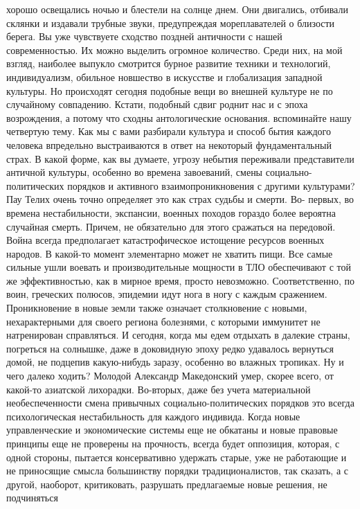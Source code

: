 хорошо освещались ночью и блестели на солнце днем. Они двигались, отбивали
склянки и издавали трубные звуки, предупреждая мореплавателей о близости берега.
Вы уже чувствуете сходство поздней античности с нашей современностью. Их можно
выделить огромное количество. Среди них, на мой взгляд, наиболее выпукло
смотрится бурное развитие техники и технологий, индивидуализм, обильное
новшество в искусстве и глобализация западной культуры. Но происходят сегодня
подобные вещи во внешней культуре не по случайному совпадению. Кстати, подобный
сдвиг роднит нас и с эпоха возрождения, а потому что сходны антологические
основания. вспоминайте нашу четвертую тему. Как мы с вами разбирали культура и
способ бытия каждого человека впредельно выстраиваются в ответ на некоторый
фундаментальный страх. В какой форме, как вы думаете, угрозу небытия переживали
представители античной культуры, особенно во времена завоеваний, смены
социально-политических порядков и активного взаимопроникновения с другими
культурами? Пау Телих очень точно определяет это как страх судьбы и смерти. Во-
первых, во времена нестабильности, экспансии, военных походов гораздо более
вероятна случайная смерть. Причем, не обязательно для этого сражаться на
передовой. Война всегда предполагает катастрофическое истощение ресурсов военных
народов. В какой-то момент элементарно может не хватить пищи. Все самые сильные
ушли воевать и производительные мощности в ТЛО обеспечивают с той же
эффективностью, как в мирное время, просто невозможно. Соответственно, по воин,
греческих полюсов, эпидемии идут нога в ногу с каждым сражением. Проникновение в
новые земли также означает столкновение с новыми, нехарактерными для своего
региона болезнями, с которыми иммунитет не натренирован справляться. И сегодня,
когда мы едем отдыхать в далекие страны, погреться на солнышке, даже в
доковидную эпоху редко удавалось вернуться домой, не подцепив какую-нибудь
заразу, особенно во влажных тропиках. Ну и чего далеко ходить? Молодой Александр
Македонский умер, скорее всего, от какой-то азиатской лихорадки. Во-вторых, даже
без учета материальной необеспеченности смена привычных социально-политических
порядков это всегда психологическая нестабильность для каждого индивида. Когда
новые управленческие и экономические системы еще не обкатаны и новые правовые
принципы еще не проверены на прочность, всегда будет оппозиция, которая, с одной
стороны, пытается консервативно удержать старые, уже не работающие и не
приносящие смысла большинству порядки традиционалистов, так сказать, а с другой,
наоборот, критиковать, разрушать предлагаемые новые решения, не подчиняться
